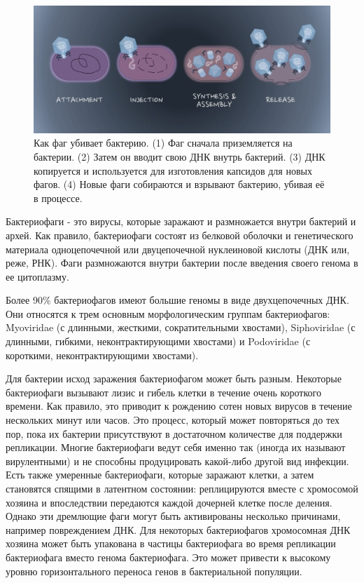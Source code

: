 \documentclass[14pt]{extarticle}
\begin{document}
    \begin{figure}[h]
        \centering
            \includegraphics[width=\textwidth]{img/average_phage.jpg}
        \caption{Как фаг убивает бактерию. (1) Фаг сначала приземляется на бактерии. (2) Затем он вводит свою ДНК внутрь
        бактерий. (3) ДНК копируется и используется для изготовления капсидов для новых фагов. (4) Новые фаги собираются
        и взрывают бактерию, убивая её в процессе. \cite{advdisphage}}
        \label{fig:skybox}
    \end{figure}
    
	\par{Бактериофаги - это вирусы, которые заражают и размножается внутри бактерий и архей. Как правило, бактериофаги 
	состоят из белковой оболочки и генетического материала одноцепочечной или двуцепочечной нуклеиновой кислоты (ДНК 
	или, реже, РНК). Фаги размножаются внутри бактерии после введения своего генома в ее цитоплазму. 
	\cite{phagewikieng,phagewikiru}}
	
	\par{Более 90\% бактериофагов имеют большие геномы в виде двухцепочечных ДНК. Они относятся к трем основным 
	морфологическим группам бактериофагов: Myoviridae (с длинными, жесткими, сократительными хвостами), Siphoviridae
	(с длинными, гибкими, неконтрактирующими хвостами) и Podoviridae (с короткими, неконтрактирующими хвостами). 
	\cite{phageapps}}
	
	\par{Для бактерии исход заражения бактериофагом может быть разным. Некоторые бактериофаги вызывают лизис и гибель 
	клетки в течение очень короткого времени. Как правило, это приводит к рождению сотен новых вирусов в течение 
	нескольких минут или часов. Это процесс, который может повторяться до тех пор, пока их бактерии 
	присутствуют в достаточном количестве для поддержки репликации. Многие бактериофаги ведут себя именно так (иногда их
	называют вирулентными) и не способны продуцировать какой-либо другой вид инфекции. Есть также умеренные 
	бактериофаги, которые заражают клетки, а затем становятся спящими в латентном состоянии: реплицируются вместе с 
	хромосомой хозяина и впоследствии передаются каждой дочерней клетке после деления. Однако эти дремлющие фаги могут 
	быть активированы несколько причинами, например повреждением ДНК. Для некоторых бактериофагов хромосомная ДНК 
	хозяина может быть упакована в частицы бактериофага во время репликации бактериофага вместо генома бактериофага. Это
	может привести к высокому уровню горизонтального переноса генов в бактериальной популяции.  \cite{phagetreat}}
    
\end{document}
